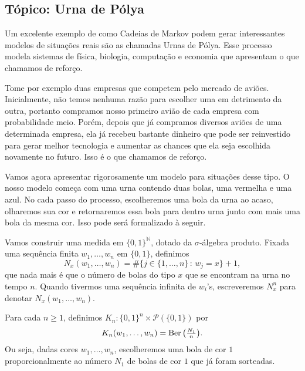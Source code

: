 \begin{topics}

\section{Tópico: Urna de Pólya}
\label{s:urna_polya}

Um excelente exemplo de como Cadeias de Markov podem gerar interessantes modelos de situações reais são as chamadas Urnas de Pólya.
Esse processo modela sistemas de física, biologia, computação e economia que apresentam o que chamamos de reforço.

Tome por exemplo duas empresas que competem pelo mercado de aviões.
Inicialmente, não temos nenhuma razão para escolher uma em detrimento da outra, portanto compramos nosso primeiro avião de cada empresa com probabilidade meio.
Porém, depois que já compramos diversos aviões de uma determinada empresa, ela já recebeu bastante dinheiro que pode ser reinvestido para gerar melhor tecnologia e aumentar as chances que ela seja escolhida novamente no futuro.
Isso é o que chamamos de reforço.

Vamos agora apresentar rigorosamente um modelo para situações desse tipo.
O nosso modelo começa com uma urna contendo duas bolas, uma vermelha e uma azul.
No cada passo do processo, escolheremos uma bola da urna ao acaso, olharemos sua cor e retornaremos essa bola para dentro urna junto com mais uma bola da mesma cor.
Isso pode será formalizado à seguir.

Vamos construir uma medida em $\{0, 1\}^\mathbb{N}$, dotado da $\sigma$-álgebra produto.
Fixada uma sequência finita $w_1, \dots, w_n$ em $\{0,1\}$, definimos
\begin{equation}
  N_x (w_1, \dots, w_n) = \# \big\{ j \in \{1, \dots, n\}\, : \, w_j = x \big\} + 1,
\end{equation}
que nada mais é que o número de bolas do tipo $x$ que se encontram na urna no tempo $n$.
Quando tivermos uma sequência infinita de $w_i$'s, escreveremos $N^n_x$ para denotar $N_x(w_1, \dots, w_n)$.

Para cada $n \geq 1$, definimos $K_n:\{0,1\}^n \times \mathcal{P}(\{0,1\})$ por
\begin{equation}
  K_n(w_1, \dots, w_n) = \operatorname{Ber}\big( \tfrac{N_1}{n} \big).
\end{equation}
Ou seja, dadas cores $w_1, \dots, w_n$, escolheremos uma bola de cor $1$ proporcionalmente ao número $N_1$ de bolas de cor $1$ que já foram sorteadas.


\end{topics}
